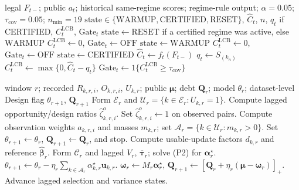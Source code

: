 \documentclass[letterpaper,journal]{IEEEtran}
\begin{document}
\begin{algorithm}[t]
\caption{Aggregate coverage certificate (formal Gate object)}
\label{alg:agg_certificate}
\begin{algorithmic}[1]
\REQUIRE legal $F_{t-}$; public $a_t$; historical same-regime scores;
regime-rule output; $\alpha=0.05$; $\tau_{\mathrm{cov}}=0.05$; $n_{\min}=19$
\ENSURE $\mathrm{state}\in\{\mathrm{WARMUP},\mathrm{CERTIFIED},\mathrm{RESET}\}$,
$\widehat C_t$, $n$, $q_t$ if CERTIFIED, $C^{\mathrm{LCB}}_t$, $\mathrm{Gate}_t$
\STATE $\mathrm{state}\leftarrow\mathrm{RESET}$ if a certified regime was active,
else $\mathrm{WARMUP}$
\STATE $C^{\mathrm{LCB}}_t\leftarrow 0$, $\mathrm{Gate}_t\leftarrow\mathrm{OFF}$
\ELSE
{}
\STATE $\mathrm{state}\leftarrow\mathrm{WARMUP}$
\STATE $C^{\mathrm{LCB}}_t\leftarrow 0$, $\mathrm{Gate}_t\leftarrow\mathrm{OFF}$
\ELSE
\STATE $\mathrm{state}\leftarrow\mathrm{CERTIFIED}$
\STATE $\widehat C_t\leftarrow f_t(F_{t-})$
\STATE $q_t\leftarrow S_{(k_n)}$ 
\STATE $C^{\mathrm{LCB}}_t\leftarrow\max\{0,\widehat C_t-q_t\}$
\STATE $\mathrm{Gate}_t\leftarrow 1\{C^{\mathrm{LCB}}_t\ge\tau_{\mathrm{cov}}\}$
\ENDIF
\ENDIF
\end{algorithmic}
\end{algorithm}

\begin{algorithm}[t]
\caption{Window-close RAVEN-MCS aggregation}
\label{alg:window_close}
\begin{algorithmic}[1]
\REQUIRE window $r$; recorded $R_{k,r,i}$, $O_{k,r,i}$, $U_{k,r}$;
public $\boldsymbol\mu$; debt $\mathbf{Q}_r$; model $\theta_r$;
dataset-level Design flag
\ENSURE $\theta_{r+1}$, $\mathbf{Q}_{r+1}$
\STATE Form $\mathcal{E}_r$ and
$\mathcal{U}_r=\{k\in\mathcal{E}_r:U_{k,r}=1\}$.
\STATE Compute lagged opportunity/design ratios
$\widehat\zeta^{o}_{k,r,i}$.
\ELSE
\STATE Set $\widehat\zeta^{o}_{k,r,i}\leftarrow 1$ on observed pairs.
\ENDIF
\STATE Compute observation weights $a_{k,r,i}$ and masses $m_{k,r}$;
set $\mathcal{A}_r=\{k\in\mathcal{U}_r:m_{k,r}>0\}$.
\STATE Set $\theta_{r+1}\leftarrow\theta_r$,
$\mathbf{Q}_{r+1}\leftarrow\mathbf{Q}_r$, and stop.
\ELSE
\STATE Compute usable-update factors $d_{k,r}$ and reference
$\widehat{\boldsymbol\beta}_r$.
\STATE Form $\mathcal{C}_r$ and lagged $V_r$,
$\overline{\boldsymbol\tau}_r$; solve (P2) for
$\boldsymbol\alpha_r^\star$.
\STATE $\theta_{r+1}\leftarrow\theta_r
-\eta_r\sum_{k\in\mathcal{A}_r}\alpha^\star_{k,r}\mathbf{u}_{k,r}$.
\STATE $\boldsymbol\omega_r\leftarrow M_r\boldsymbol\alpha_r^\star$,
$\mathbf{Q}_{r+1}\leftarrow
[\mathbf{Q}_r+\eta_r(\boldsymbol\mu-\boldsymbol\omega_r)]_+$.
\STATE Advance lagged selection and variance states.
\ENDIF
\end{algorithmic}
\end{algorithm}
\end{document}
